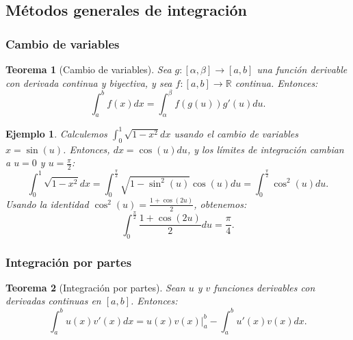 \documentclass[12pt, a4paper]{article}
\theoremstyle{rioplatense}
\newtheorem{teorema}{Teorema}[section]
\newtheorem{ejemplo}{Ejemplo}[section]
\begin{document}



\subsection{Métodos generales de integración}
\subsubsection{Cambio de variables}
\begin{teorema}[Cambio de variables]
    Sea $g: [\alpha, \beta] \to [a, b]$ una función derivable con derivada continua y biyectiva, y sea $f: [a, b] \to \mathbb{R}$ continua. Entonces:
    $$
    \int_a^b f(x)  dx = \int_{\alpha}^{\beta} f(g(u)) g'(u)  du.
    $$
\end{teorema}

\begin{ejemplo}
    Calculemos $\int_0^1 \sqrt{1 - x^2}  dx$ usando el cambio de variables $x = \sin(u)$. Entonces, $dx = \cos(u)  du$, y los límites de integración cambian a $u = 0$ y $u = \frac{\pi}{2}$:
    $$
    \int_0^1 \sqrt{1 - x^2}  dx = \int_0^{\frac{\pi}{2}} \sqrt{1 - \sin^2(u)} \cos(u)  du = \int_0^{\frac{\pi}{2}} \cos^2(u)  du.
    $$
    Usando la identidad $\cos^2(u) = \frac{1 + \cos(2u)}{2}$, obtenemos:
    $$
    \int_0^{\frac{\pi}{2}} \frac{1 + \cos(2u)}{2}  du = \frac{\pi}{4}.
    $$
\end{ejemplo}

\subsubsection{Integración por partes}
\begin{teorema}[Integración por partes]
    Sean $u$ y $v$ funciones derivables con derivadas continuas en $[a, b]$. Entonces:
    $$
    \int_a^b u(x) v'(x)  dx = u(x) v(x) \Big|_a^b - \int_a^b u'(x) v(x)  dx.
    $$
\end{teorema}
\end{document}
